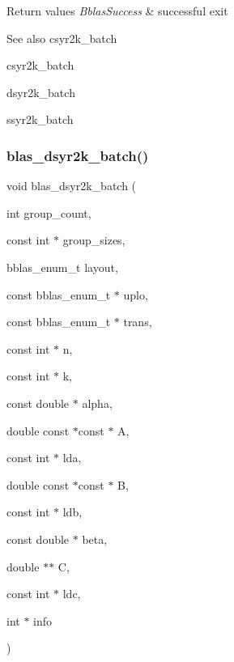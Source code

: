 \begin{DoxyRetVals}{Return values}
{\em Bblas\+Success} & successful exit\\
\hline
\end{DoxyRetVals}
\begin{DoxySeeAlso}{See also}
csyr2k\+\_\+batch 

csyr2k\+\_\+batch 

dsyr2k\+\_\+batch 

ssyr2k\+\_\+batch 
\end{DoxySeeAlso}
\mbox{\label{group__syr2k__batch_ga92363ade2cc637cbb79d139085ac715f}} 
\subsubsection{\texorpdfstring{blas\+\_\+dsyr2k\+\_\+batch()}{blas\_dsyr2k\_batch()}}
{\footnotesize\ttfamily void blas\+\_\+dsyr2k\+\_\+batch (\begin{DoxyParamCaption}\item[{int}]{group\+\_\+count,  }\item[{const int $\ast$}]{group\+\_\+sizes,  }\item[{bblas\+\_\+enum\+\_\+t}]{layout,  }\item[{const bblas\+\_\+enum\+\_\+t $\ast$}]{uplo,  }\item[{const bblas\+\_\+enum\+\_\+t $\ast$}]{trans,  }\item[{const int $\ast$}]{n,  }\item[{const int $\ast$}]{k,  }\item[{const double $\ast$}]{alpha,  }\item[{double const $\ast$const $\ast$}]{A,  }\item[{const int $\ast$}]{lda,  }\item[{double const $\ast$const $\ast$}]{B,  }\item[{const int $\ast$}]{ldb,  }\item[{const double $\ast$}]{beta,  }\item[{double $\ast$$\ast$}]{C,  }\item[{const int $\ast$}]{ldc,  }\item[{int $\ast$}]{info }\end{DoxyParamCaption})}

